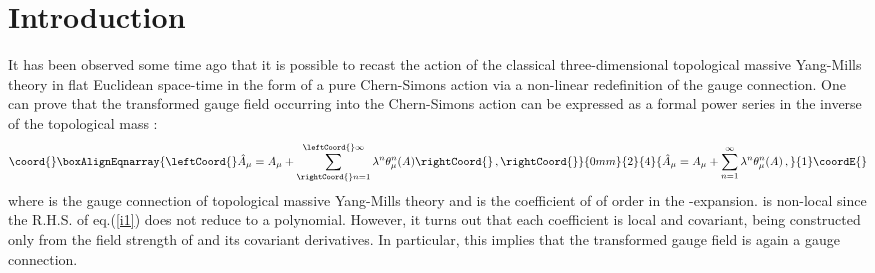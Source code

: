 \documentclass[a4paper,11pt]{article}
\begin{document}


\section{Introduction}

It has been observed some time ago \cite{sorella1,sorella2} that 
it is possible to recast the action of the 
classical three-dimensional topological  massive Yang-Mills theory
in flat Euclidean space-time
in the form of a pure Chern-Simons action via a non-linear 
redefinition of the gauge connection.
One can prove \cite{sorella1, sorella2} that the transformed
gauge field occurring into the Chern-Simons action
can be expressed as a formal power series
in the inverse \coordHE{} of the topological mass \coordHE{}:
%
\begin{eqnarray}\coord{}\boxAlignEqnarray{\leftCoord{}
\hat A_\mu = A_\mu + \sum_{\rightCoord{}n=1}^{\leftCoord{}\infty} \lambda^n \theta^n_\mu(A) \rightCoord{}\, ,
\label{i1}
\rightCoord{}}{0mm}{2}{4}{
\hat A_\mu = A_\mu + \sum_{n=1}^{\infty} \lambda^n \theta^n_\mu(A) \, ,
}{1}\coordE{}\end{eqnarray}
%
where \coordHE{} is the gauge connection of topological massive Yang-Mills
theory and \coordHE{} is
the coefficient of \coordHE{} of order \coordHE{} in the \myHighlight{$\lambda$}\coordHE{}-expansion.
\coordHE{} is non-local since the R.H.S. of eq.(\ref{i1})
does not reduce to a polynomial. However, it turns out that
each coefficient \coordHE{} 
is local and covariant, being constructed only from the
field strength of \coordHE{}  and its covariant derivatives.
In particular, this implies that the transformed gauge field 
\coordHE{} is  again a gauge connection.
\end{document}
